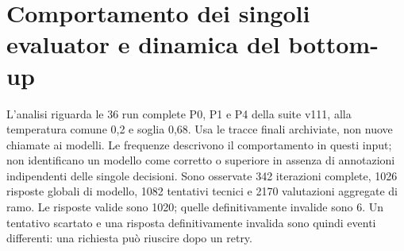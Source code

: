 \section{Comportamento dei singoli evaluator e dinamica del bottom-up}
\label{sec:evaluator-dynamics-v111}
L'analisi riguarda le 36 run complete P0, P1 e P4 della suite v111,
alla temperatura comune 0,2 e soglia 0,68. Usa le tracce finali archiviate,
non nuove chiamate ai modelli. Le frequenze descrivono il comportamento
in questi input; non identificano un modello come corretto o superiore
in assenza di annotazioni indipendenti delle singole decisioni.
Sono osservate 342 iterazioni complete, 1026 risposte
globali di modello, 1082 tentativi tecnici e 2170
valutazioni aggregate di ramo. Le risposte valide sono 1020;
quelle definitivamente invalide sono 6.
Un tentativo scartato e una risposta definitivamente invalida sono quindi
eventi differenti: una richiesta pu\`o riuscire dopo un retry.
